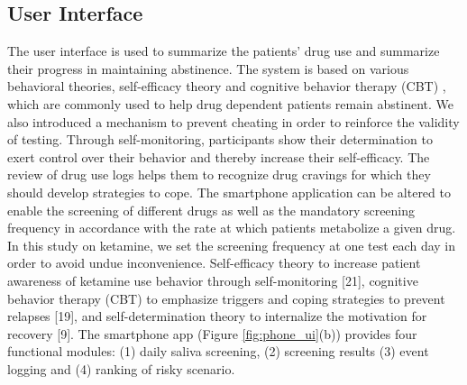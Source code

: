 \subsection{User Interface}
The user interface is used to summarize the patients' drug use and summarize their progress in maintaining abstinence. The system is based on various behavioral theories, self-efficacy theory \cite{Bandura1994} and cognitive behavior therapy (CBT) \cite{Volkow2011}, which are commonly used to help drug dependent patients remain abstinent. We also introduced a mechanism to prevent cheating in order to reinforce the validity of testing. Through self-monitoring, participants show their determination to exert control over their behavior and thereby increase their self-efficacy. The review of drug use logs helps them to recognize drug cravings for which they should develop strategies to cope. The smartphone application can be altered to enable the screening of different drugs as well as the mandatory screening frequency in accordance with the rate at which patients metabolize a given drug. In this study on ketamine, we set the screening frequency at one test each day in order to avoid undue inconvenience.
Self-efficacy theory to increase patient awareness of ketamine use behavior through self-monitoring [21], cognitive behavior therapy (CBT) to emphasize triggers and coping strategies to prevent relapses [19], and self-determination theory to internalize the motivation for recovery [9]. 
The smartphone app (Figure \ref{fig:phone_ui}(b)) provides four functional modules: (1) daily saliva screening, (2) screening results (3) event logging and (4) ranking of risky scenario.  


